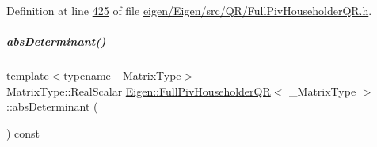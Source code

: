 Definition at line \hyperlink{eigen_2_eigen_2src_2_q_r_2_full_piv_householder_q_r_8h_source_l00425}{425} of file \hyperlink{eigen_2_eigen_2src_2_q_r_2_full_piv_householder_q_r_8h_source}{eigen/\+Eigen/src/\+Q\+R/\+Full\+Piv\+Householder\+Q\+R.\+h}.

\mbox{\label{group___q_r___module_a11400130bbbdc062ef613e080fed2f23}} 
\subparagraph{\texorpdfstring{abs\+Determinant()}{absDeterminant()}\hspace{0.1cm}{\footnotesize\ttfamily [2/2]}}
{\footnotesize\ttfamily template$<$typename \+\_\+\+Matrix\+Type$>$ \\
Matrix\+Type\+::\+Real\+Scalar \hyperlink{group___q_r___module_class_eigen_1_1_full_piv_householder_q_r}{Eigen\+::\+Full\+Piv\+Householder\+QR}$<$ \+\_\+\+Matrix\+Type $>$\+::abs\+Determinant (\begin{DoxyParamCaption}{ }\end{DoxyParamCaption}) const}

